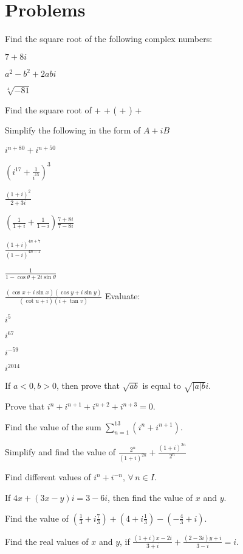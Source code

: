 \section{Problems}
Find the square root of the following complex numbers:


\startitemize[n, 1*broad]
\item $7 + 8i$
\item $a^2 - b^2 + 2abi$
\item $\sqrt[4]{-81}$
\item Find the square root of \startformula {} +  + \left( + \right) +
  \stopformula

\noindent Simplify the following in the form of $A + iB$
\item $i^{n + 80} + i^{n + 50}$
\item $\left(i^{17} + \frac{1}{i^{15}}\right)^3$
\item $\frac{(1 + i)^2}{2 + 3i}$
\item $\left(\frac{1}{1 + i} + \frac{1}{1 - i}\right)\frac{7 + 8i}{7 - 8i}$
\item $\frac{(1 + i)^{4n + 7}}{(1 - i)^{4n - 1}}$
\item $\frac{1}{1 - \cos\theta + 2i\sin\theta}$
\item $\frac{(\cos x + i\sin x)(\cos y + i\sin y)}{(\cot u + i)(i + \tan v)}$
\noindent Evaluate:
\item $i^5$
\item $i^{67}$
\item $i^{-59}$
\item $i^{2014}$
\item If $a<0, b>0$, then prove that $\sqrt{ab}$ is equal to $\sqrt{|a|b}i$.
\item Prove that $i^n + i^{n + 1} + i^{n + 2} + i^{n + 3} = 0$.
\item Find the value of the sum $\displaystyle\sum_{n = 1}^{13}(i^n + i^{n + 1})$.
\item Simplify and find the value of $\frac{2^n}{(1 + i)^{2n}} + \frac{(1 + i)^{2n}}{2^n}$
\item Find different values of $i^n + i^{-n}, \,\forall\,n\in I$.
\item If $4x + (3x - y)i = 3 - 6i$, then find the value of $x$ and $y$.
\item Find the value of $\left(\frac{1}{3} + i\frac{7}{3}\right) + \left(4 + i\frac{1}{3}\right) - \left(-\frac{4}{3} + i\right)$.
\item Find the real values of $x$ and $y$, if $\frac{(1 + i)x - 2i}{3 + i} + \frac{(2 - 3i)y + i}{3 - i} = i$.
